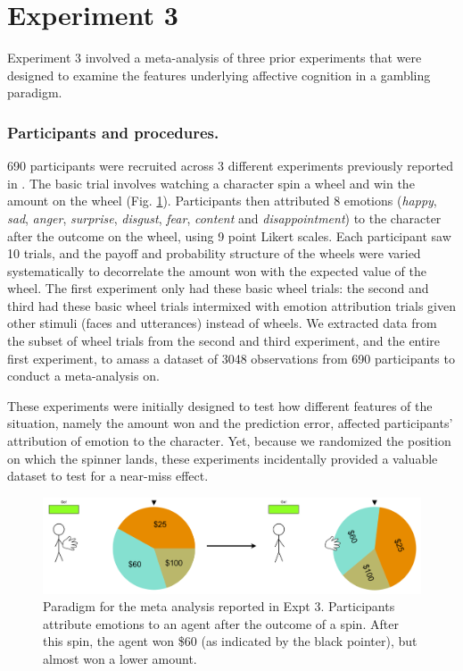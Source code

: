 \documentclass[10pt,letterpaper]{article}
\begin{document}


\section{Experiment 3}
	Experiment 3 involved a meta-analysis of three prior experiments that were designed to examine the features underlying affective cognition in a gambling paradigm. 
	
\subsubsection{Participants and procedures.}
	690 participants were recruited across 3 different experiments previously reported in . The basic trial involves watching a character spin a wheel and win the amount on the wheel (Fig. \ref{Expt3ParadigmFig}). Participants then attributed 8 emotions (\textit{happy}, \textit{sad}, \textit{anger}, \textit{surprise}, \textit{disgust}, \textit{fear}, \textit{content} and \textit{disappointment}) to the character after the outcome on the wheel, using 9 point Likert scales. Each participant saw 10 trials, and the payoff and probability structure of the wheels were varied systematically to decorrelate the amount won with the expected value of the wheel. The first experiment only had these basic wheel trials: the second and third had these basic wheel trials intermixed with emotion attribution trials given other stimuli (faces and utterances) instead of wheels. We extracted data from the subset of wheel trials from the second and third experiment, and the entire first experiment, to amass a dataset of 3048 observations from 690 participants to conduct a meta-analysis on.
	
	These experiments were initially designed to test how different features of the situation, namely the amount won and the prediction error, affected participants' attribution of emotion to the character. Yet, because we randomized the position on which the spinner lands, these experiments incidentally provided a valuable dataset to test for a near-miss effect.

\begin{figure}[htb!]
\includegraphics[width=\columnwidth]{images/expt3Paradigm.png}
\caption{ Paradigm for the meta analysis reported in Expt 3. Participants attribute emotions to an agent after the outcome of a spin. After this spin, the agent won \$60 (as indicated by the black pointer), but almost won a lower amount. }
\label{Expt3ParadigmFig}
\end{figure}
\end{document}
